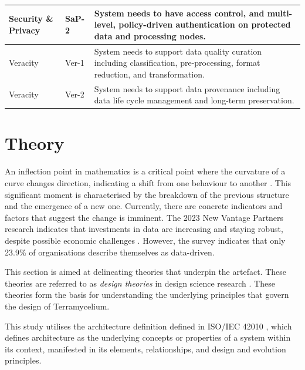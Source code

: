 \documentclass[review]{elsarticle}
\begin{document}
\begin{table}
\begin{tabular}{|l|l|p{10cm}|}
  \hline

  Security \& Privacy & SaP-2 & System needs to have access control, and multi-level, policy-driven authentication on protected data and processing nodes. \\

  \hline

  Veracity & Ver-1 & System needs to support data quality curation including classification, pre-processing, format reduction, and transformation. \\

  \hline

  Veracity & Ver-2 & System needs to support data provenance including data life cycle management and long-term preservation. \\

  \hline

  \end{tabular}

\end{table}

\section{Theory}

\label{sec:theory}

An inflection point in mathematics is a critical point where the curvature of a curve changes direction, indicating a shift from one behaviour to another \cite{inflectionPoint}. This significant moment is characterised by the breakdown of the previous structure and the emergence of a new one. Currently, there are concrete indicators and factors that suggest the change is imminent. The 2023 New Vantage Partners research indicates that investments in data are increasing and staying robust, despite possible economic challenges \cite{newvantagepartners2023}. However, the survey indicates that only 23.9\% of organisations describe themselves as data-driven. 

This section is aimed at delineating theories that underpin the artefact. These theories are referred to as \emph{design theories} in design science research \cite{Rose}. These theories form the basis for understanding the underlying principles that govern the design of Terramycelium.

This study utilises the architecture definition defined in ISO/IEC 42010 \cite{ISO42010}, which defines architecture as the underlying concepts or properties of a system within its context, manifested in its elements, relationships, and design and evolution principles.
\end{document}
